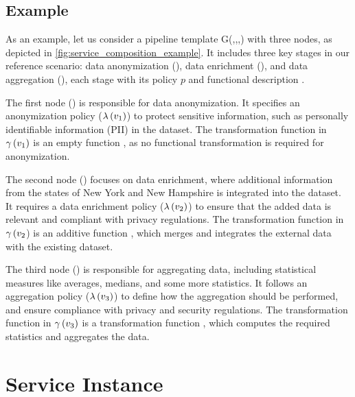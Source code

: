 \subsection{Example}\label{sec:example}
As an example, let us consider a pipeline template G(\V,\E,\myLambda,\myGamma) with three nodes, as depicted in \cref{fig:service_composition_example}.
It includes three key stages in our reference scenario: data anonymization (), data enrichment (), and data aggregation (), each stage with its policy $p$ and functional description \F.

The first node () is responsible for data anonymization.
It specifies an anonymization policy ($\lambda\,(v_1)$) to protect sensitive information, such as personally identifiable information (PII) in the dataset.
The transformation function  in $\gamma\,(v_1)$ is an empty function , as no functional transformation is required for anonymization.

The second node () focuses on data enrichment, where additional information from the states of New York and New Hampshire is integrated into the dataset.
It requires a data enrichment policy ($\lambda\,(v_2)$) to ensure that the added data is relevant and compliant with privacy regulations.
The transformation function  in $\gamma\,(v_2$) is an additive function , which merges and integrates the external data with the existing dataset.

  The third node () is responsible for aggregating data, including statistical measures like averages, medians, and some more statistics.
  It follows an aggregation policy ($\lambda\,(v_3)$) to define how the aggregation should be performed, and ensure compliance with privacy and security regulations.
  The transformation function  in $\gamma\,(v_3)$ is a transformation function , which computes the required statistics and aggregates the data.

  \section{Service Instance}

